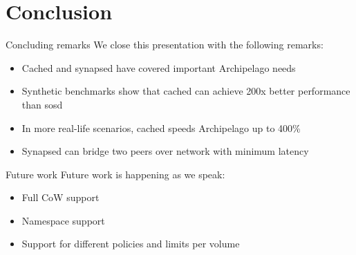 \section{Conclusion}

\begin{frame}{Concluding remarks}
	We close this presentation with the following remarks:
	\begin{itemize}
		\item Cached and synapsed have covered important Archipelago needs
		\item Synthetic benchmarks show that cached can achieve 200x better 
			performance than sosd
		\item In more real-life scenarios, cached speeds Archipelago up to 
			400\%
		\item Synapsed can bridge two peers over network with minimum latency
	\end{itemize}
\end{frame}

\begin{frame}{Future work}
	Future work is happening as we speak:
	\begin{itemize}
		\item Full CoW support
		\item Namespace support
		\item Support for different policies and limits per volume
	\end{itemize}
\end{frame}
